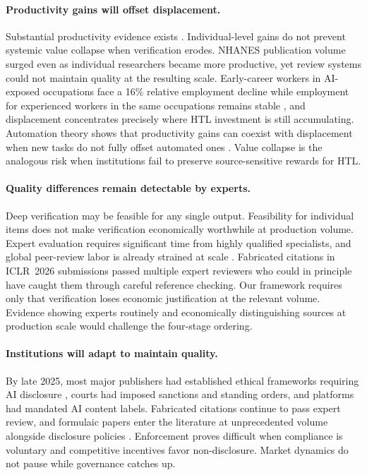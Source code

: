 \documentclass{article}
\theoremstyle{plain}
\theoremstyle{definition}
\theoremstyle{remark}
\begin{document}
\paragraph{Productivity gains will offset displacement.}
Substantial productivity evidence exists \citep{doi:10.1126/science.adh2586, 10.1093/qje/qjae044, doi:10.1073/pnas.2305016120}. Individual-level gains do not prevent systemic value collapse when verification erodes. NHANES publication volume surged even as individual researchers became more productive, yet review systems could not maintain quality at the resulting scale. Early-career workers in AI-exposed occupations face a 16\% relative employment decline while employment for experienced workers in the same occupations remains stable \citep{brynjolfsson2025canaries}, and displacement concentrates precisely where HTL investment is still accumulating. Automation theory shows that productivity gains can coexist with displacement when new tasks do not fully offset automated ones \citep{10.1257/jep.33.2.3}. Value collapse is the analogous risk when institutions fail to preserve source-sensitive rewards for HTL.

\paragraph{Quality differences remain detectable by experts.}
Deep verification may be feasible for any single output. Feasibility for individual items does not make verification economically worthwhile at production volume. Expert evaluation requires significant time from highly qualified specialists, and global peer-review labor is already strained at scale \citep{aczel2021estimating}. Fabricated citations in ICLR~2026 submissions passed multiple expert reviewers who could in principle have caught them through careful reference checking. Our framework requires only that verification loses economic justification at the relevant volume. Evidence showing experts routinely and economically distinguishing sources at production scale would challenge the four-stage ordering.

\paragraph{Institutions will adapt to maintain quality.}
By late 2025, most major publishers had established ethical frameworks requiring AI disclosure \citep{gewaltig-2025-ai, zhu-2025-generative}, courts had imposed sanctions and standing orders, and platforms had mandated AI content labels. Fabricated citations continue to pass expert review, and formulaic papers enter the literature at unprecedented volume alongside disclosure policies \citep{suchak-etal-2025-explosion, esau-etal-2025-gptzero}. Enforcement proves difficult when compliance is voluntary and competitive incentives favor non-disclosure. Market dynamics do not pause while governance catches up.
\end{document}
